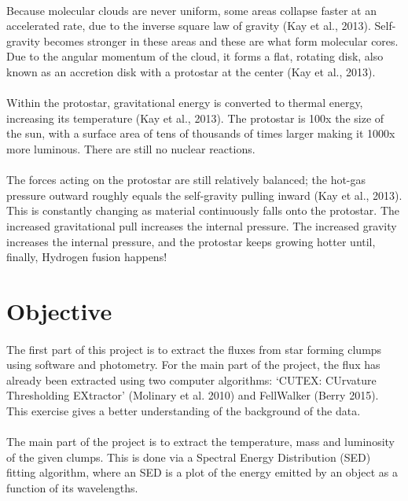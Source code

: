 \documentclass{article}
\begin{document}
\paragraph{}
Because molecular clouds are never uniform, some areas collapse faster at an accelerated rate, due to the inverse square law of gravity (Kay et al., 2013). Self-gravity becomes stronger in these areas and these are what form molecular cores. Due to the angular momentum of the cloud, it forms a flat, rotating disk, also known as an accretion disk with a protostar at the center (Kay et al., 2013). 
\paragraph{}
Within the protostar, gravitational energy is converted to thermal energy, increasing its temperature (Kay et al., 2013). The protostar is 100x the size of the sun, with a surface area of tens of thousands of times larger making it 1000x more luminous. There are still no nuclear reactions. 
\paragraph{}
The forces acting on the protostar are still relatively balanced; the hot-gas pressure outward roughly equals the self-gravity pulling inward (Kay et al., 2013). This is constantly changing as material continuously falls onto the protostar. The increased gravitational pull increases the internal pressure. The increased gravity increases the internal pressure, and the protostar keeps growing hotter until, finally, Hydrogen fusion happens!

\section{Objective}
\paragraph{}

The first part of this project is to extract the fluxes from star forming clumps using software and photometry. For the main part of the project, the flux has already been extracted using two computer algorithms: ‘CUTEX: CUrvature Thresholding EXtractor’ (Molinary et al. 2010) and FellWalker (Berry 2015). This exercise gives a better understanding of the background of the data.
\paragraph{}
The main part of the project is to extract the temperature, mass and luminosity of the given clumps. This is done via a Spectral Energy Distribution (SED) fitting algorithm, where an SED is a plot of the energy emitted by an object as a function of its wavelengths. 
\end{document}

